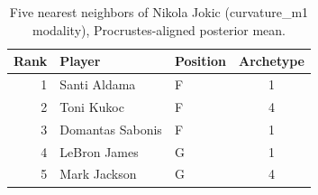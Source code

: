 \begin{table}[htbp]
  \centering\small
  \begin{tabular}{rllc}
    \toprule
    Rank & Player & Position & Archetype \\
    \midrule
    1 & Santi Aldama & F & 1 \\
    2 & Toni Kukoc & F & 4 \\
    3 & Domantas Sabonis & F & 1 \\
    4 & LeBron James & G & 1 \\
    5 & Mark Jackson & G & 4 \\
    \bottomrule
  \end{tabular}
  \caption{Five nearest neighbors of Nikola Jokic (curvature_m1 modality), Procrustes-aligned posterior mean.}
  \label{tab:Nikola_Jokic_neighbors_curvature_m1}
\end{table}

